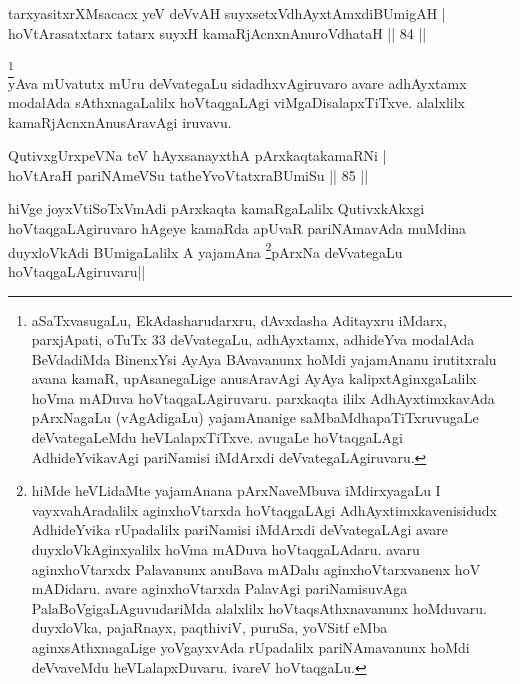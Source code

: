 
\begin{shl}
tarxyasitxrXMsacacx yeV deVvAH suyxsetxV\s dhAyxtAmxdiBUmigAH | \\
hoVtArasatxtarx tatarx suyxH kamaRjAcnxnAnuroVdhataH \hfill|| 84 || 
\end{shl}

\begin{artha}
\footnote[1]{aSaTxvasugaLu, EkAdasharudarxru, dAvxdasha Aditayxru 
iMdarx, parxjApati, oTuTx 33 deVvategaLu, adhAyxtamx, adhideYva 
modalAda BeVdadiMda BinenxYsi AyAya BAvavanunx hoMdi yajamAnanu 
irutitxralu avana kamaR, upAsanegaLige anusAravAgi AyAya 
kalipxtAginxgaLalilx hoVma mADuva hoVtaqgaLAgiruvaru. parxkaqta ililx 
AdhAyxtimxkavAda pArxNagaLu (vAgAdigaLu) yajamAnanige 
saMbaMdhapaTiTxruvugaLe deVvategaLeMdu heVLalapxTiTxve. avugaLe 
hoVtaqgaLAgi AdhideYvikavAgi pariNamisi iMdArxdi deVvategaLAgiruvaru.}\\
yAva mUvatutx mUru deVvategaLu sidadhxvAgiruvaro avare adhAyxtamx 
modalAda sAthxnagaLalilx hoVtaqgaLAgi viMgaDisalapxTiTxve. alalxlilx 
kamaRjAcnxnAnusAravAgi iruvavu.
\end{artha}

\begin{shl}
QutivxgUrxpeVNa teV hAyxsanayxthA pArxkaqtakamaRNi | \\
hoVtAraH pariNAmeVSu tatheYvoVtatxraBUmiSu \hfill|| 85 || 
\end{shl}

\begin{artha}
hiVge joyxVtiSoTxVmAdi pArxkaqta kamaRgaLalilx QutivxkAkxgi 
hoVtaqgaLAgiruvaro hAgeye kamaRda apUvaR pariNAmavAda muMdina 
duyxloVkAdi BUmigaLalilx A yajamAna \footnote[1]{hiMde heVLidaMte 
yajamAnana pArxNaveMbuva iMdirxyagaLu I vayxvahAradalilx 
aginxhoVtarxda hoVtaqgaLAgi AdhAyxtimxkavenisidudx AdhideYvika 
rUpadalilx pariNamisi iMdArxdi deVvategaLAgi avare duyxloVkAginxyalilx 
hoVma mADuva hoVtaqgaLAdaru. avaru aginxhoVtarxdx Palavanunx anuBava 
mADalu aginxhoVtarxvanenx hoV mADidaru. avare aginxhoVtarxda PalavAgi 
pariNamisuvAga PalaBoVgigaLAguvudariMda alalxlilx hoVtaqsAthxnavanunx 
hoMduvaru. duyxloVka, pajaRnayx, paqthiviV, puruSa, yoVSitf eMba 
aginxsAthxnagaLige yoVgayxvAda rUpadalilx pariNAmavanunx hoMdi 
deVvaveMdu heVLalapxDuvaru. ivareV hoVtaqgaLu.}pArxNa deVvategaLu 
hoVtaqgaLAgiruvaru||
\end{artha}


